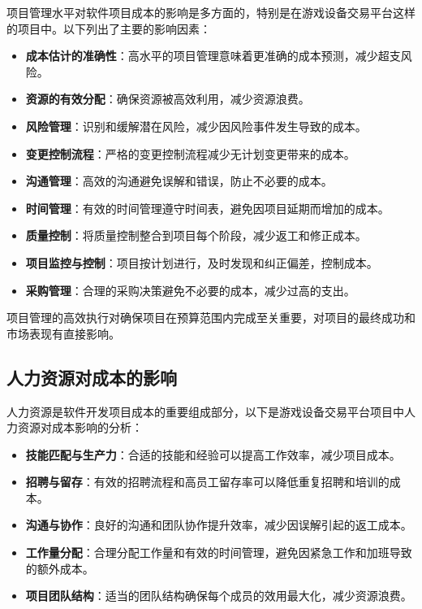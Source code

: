 \documentclass{ctexart}
\begin{document}
项目管理水平对软件项目成本的影响是多方面的，特别是在游戏设备交易平台这样的项目中。以下列出了主要的影响因素：

\begin{itemize}
    \item \textbf{成本估计的准确性}：高水平的项目管理意味着更准确的成本预测，减少超支风险。
    \item \textbf{资源的有效分配}：确保资源被高效利用，减少资源浪费。
    \item \textbf{风险管理}：识别和缓解潜在风险，减少因风险事件发生导致的成本。
    \item \textbf{变更控制流程}：严格的变更控制流程减少无计划变更带来的成本。
    \item \textbf{沟通管理}：高效的沟通避免误解和错误，防止不必要的成本。
    \item \textbf{时间管理}：有效的时间管理遵守时间表，避免因项目延期而增加的成本。
    \item \textbf{质量控制}：将质量控制整合到项目每个阶段，减少返工和修正成本。
    \item \textbf{项目监控与控制}：项目按计划进行，及时发现和纠正偏差，控制成本。
    \item \textbf{采购管理}：合理的采购决策避免不必要的成本，减少过高的支出。
\end{itemize}

项目管理的高效执行对确保项目在预算范围内完成至关重要，对项目的最终成功和市场表现有直接影响。

\subsection{人力资源对成本的影响}

人力资源是软件开发项目成本的重要组成部分，以下是游戏设备交易平台项目中人力资源对成本影响的分析：

\begin{itemize}
    \item \textbf{技能匹配与生产力}：合适的技能和经验可以提高工作效率，减少项目成本。
    \item \textbf{招聘与留存}：有效的招聘流程和高员工留存率可以降低重复招聘和培训的成本。
    \item \textbf{沟通与协作}：良好的沟通和团队协作提升效率，减少因误解引起的返工成本。
    \item \textbf{工作量分配}：合理分配工作量和有效的时间管理，避免因紧急工作和加班导致的额外成本。
    \item \textbf{项目团队结构}：适当的团队结构确保每个成员的效用最大化，减少资源浪费。
\end{itemize}
\end{document}
